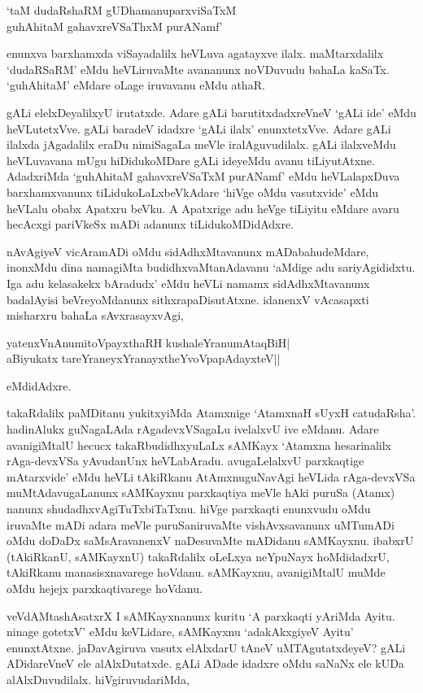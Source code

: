 \begin{shloka}
`taM dudaRshaRM gUDhamanuparxviSaTxM\\
guhAhitaM gahavxreVSaThxM purANamf'
\end{shloka}

enunxva barxhamxda viSayadalilx heVLuva agatayxve ilalx. maMtarxdalilx `dudaRSaRM' eMdu heVLiruvaMte avananunx noVDuvudu bahaLa kaSaTx. `guhAhitaM' eMdare oLage iruvavanu eMdu athaR.

gALi elelxDeyalilxyU irutatxde. Adare gALi barutitxdadxreVneV `gALi ide' eMdu heVLutetxVve. gALi baradeV idadxre `gALi ilalx' enunxtetxVve. Adare gALi ilalxda jAgadalilx eraDu nimiSagaLa meVle iralAguvudilalx. gALi ilalxveMdu heVLuvavana mUgu hiDidukoMDare gALi ideyeMdu avanu tiLiyutAtxne. AdadxriMda `guhAhitaM gahavxreVSaTxM purANamf' eMdu heVLalapxDuva barxhamxvanunx tiLidukoLaLxbeVkAdare `hiVge oMdu vasutxvide' eMdu heVLalu obabx Apatxru beVku. A Apatxrige adu heVge tiLiyitu eMdare avaru hecAcxgi pariVkeSx mADi adanunx tiLidukoMDidAdxre.

nAvAgiyeV vicAramADi oMdu sidAdhxMtavanunx mADabahudeMdare, inonxMdu dina namagiMta budidhxvaMtanAdavanu `aMdige adu sariyAgididxtu. Iga adu kelasakekx bAradudx' eMdu heVLi namamx sidAdhxMtavanunx badalAyisi beVreyoMdanunx sithxrapaDisutAtxne. idanenxV vAcasapxti misharxru bahaLa sAvxrasayxvAgi,

\begin{shloka}
yatenxVnAnumitoV\s payxthaRH kushaleYranumAtaqBiH|\\
aBiyukatx tareYraneyxYranayxtheYvoVpapAdayxteV||
\end{shloka}

eMdidAdxre.

takaRdalilx paMDitanu yukitxyiMda Atamxnige `AtamxnaH sUyxH catudaRsha'. hadinAlukx guNagaLAda rAgadevxVSagaLu ivelalxvU ive eMdanu. Adare avanigiMtalU hecucx takaRbudidhxyuLaLx sAMKayx `Atamxna hesarinalilx rAga-devxVSa yAvudanUnx heVLabAradu. avugaLelalxvU parxkaqtige mAtarxvide' eMdu heVLi tAkiRkanu AtAmxnuguNavAgi heVLida rAga-devxVSa muMtAdavugaLanunx sAMKayxnu parxkaqtiya meVle hAki puruSa (Atamx) nanunx shudadhxvAgiTuTxbiTaTxnu. hiVge parxkaqti enunxvudu oMdu iruvaMte mADi adara meVle puruSaniruvaMte vishAvxsavanunx uMTumADi oMdu doDaDx saMsAravanenxV naDesuvaMte mADidanu sAMKayxnu. ibabxrU (tAkiRkanU, sAMKayxnU) takaRdalilx oLeLxya neYpuNayx hoMdidadxrU, tAkiRkanu manasisxnavarege hoVdanu. sAMKayxnu, avanigiMtalU muMde oMdu hejejx parxkaqtivarege hoVdanu.

veVdAMtashAsatxrX I sAMKayxnanunx kuritu `A parxkaqti yAriMda Ayitu. ninage gotetxV' eMdu keVLidare, sAMKayxnu `adakAkxgiyeV Ayitu' enunxtAtxne. jaDavAgiruva vasutx elAlxdarU tAneV uMTAgutatxdeyeV? gALi ADidareVneV ele alAlxDutatxde. gALi ADade idadxre oMdu saNaNx ele kUDa alAlxDuvudilalx. hiVgiruvudariMda,

